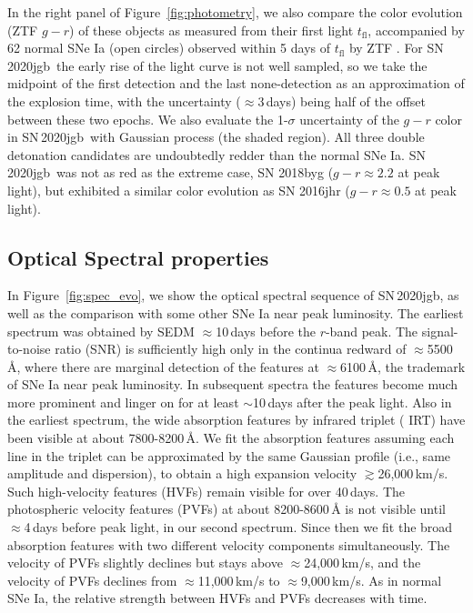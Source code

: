 \documentclass[twocolumn]{aastex631}
\newcommand\sn{SN\,2020jgb}
\begin{document}
In the right panel of Figure~\ref{fig:photometry}, we also compare the color evolution (ZTF $g-r$) of these objects as measured from their first light $t_\mathrm{fl}$, accompanied by 62 normal SNe Ia (open circles) observed within 5 days of $t_\mathrm{fl}$ by ZTF \citep[from][]{Bulla2020}. For \sn\, the early rise of the light curve is not well sampled, so we take the midpoint of the first detection and the last none-detection as an approximation of the explosion time, with the uncertainty ($\approx$3\,days) being half of the offset between these two epochs. We also evaluate the 1-$\sigma$ uncertainty of the $g-r$ color in \sn\ with Gaussian process (the shaded region). All three double detonation candidates are undoubtedly redder than the normal SNe Ia. \sn\ was not as red as the extreme case, SN 2018byg ($g-r\approx2.2$ at peak light), but exhibited a similar color evolution as SN 2016jhr ($g-r\approx0.5$ at peak light).

\subsection{Optical Spectral properties}
In Figure~\ref{fig:spec_evo}, we show the optical spectral sequence of \sn, as well as the comparison with some other SNe Ia near peak luminosity. The earliest spectrum was obtained by SEDM $\approx$10\,days before the $r$-band peak. The signal-to-noise ratio (SNR) is sufficiently high only in the continua redward of $\approx$5500\,\r{A}, where there are marginal detection of the  features at $\approx$6100\,\r{A}, the trademark of SNe Ia near peak luminosity. In subsequent spectra the  features become much more prominent and linger on for at least $\sim$10\,days after the peak light. Also in the earliest spectrum, the wide absorption features by  infrared triplet ( IRT) have been visible at about 7800-8200\,\r{A}. We fit the absorption features assuming each line in the triplet can be approximated by the same Gaussian profile (i.e., same amplitude and dispersion), to obtain a high expansion velocity $\gtrsim$26,000\,km/s. Such high-velocity features (HVFs) remain visible for over 40\,days. The photospheric velocity features (PVFs) at about 8200-8600\,\r{A} is not visible until $\approx$4\,days before peak light, in our second spectrum. Since then we fit the broad absorption features with two different velocity components simultaneously. The velocity of PVFs slightly declines but stays above $\approx$24,000\,km/s, and the velocity of PVFs declines from $\approx$11,000\,km/s to $\approx$9,000\,km/s. As in normal SNe Ia, the relative strength between HVFs and PVFs decreases with time.
\end{document}
